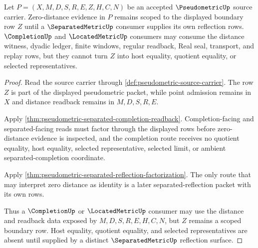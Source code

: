 \begin{theorem}
\label{thm:pseudometric-zero-distance-scope}
Let $P=(X,M,D,S,R,E,Z,H,C,N)$ be an accepted $\PseudometricUp$ source carrier. Zero-distance evidence in $P$ remains scoped to the displayed boundary row $Z$ until a $\SeparatedMetricUp$ consumer supplies its own reflection rows. $\CompletionUp$ and $\LocatedMetricUp$ consumers may consume the distance witness, dyadic ledger, finite windows, regular readback, Real seal, transport, and replay rows, but they cannot turn $Z$ into host equality, quotient equality, or selected representatives.
\end{theorem}
\begin{proof}
Read the source carrier through \autoref{def:pseudometric-source-carrier}. The row $Z$ is part of the displayed pseudometric packet, while point admission remains in $X$ and distance readback remains in $M,D,S,R,E$.

Apply \autoref{thm:pseudometric-separated-completion-readback}. Completion-facing and separated-facing reads must factor through the displayed rows before zero-distance evidence is inspected, and the completion route receives no quotient equality, host equality, selected representative, selected limit, or ambient separated-completion coordinate.

Apply \autoref{thm:pseudometric-separated-reflection-factorization}. The only route that may interpret zero distance as identity is a later separated-reflection packet with its own rows.

Thus a $\CompletionUp$ or $\LocatedMetricUp$ consumer may use the distance and readback data exposed by $M,D,S,R,E,H,C,N$, but $Z$ remains a scoped boundary row. Host equality, quotient equality, and selected representatives are absent until supplied by a distinct $\SeparatedMetricUp$ reflection surface.
\end{proof}

